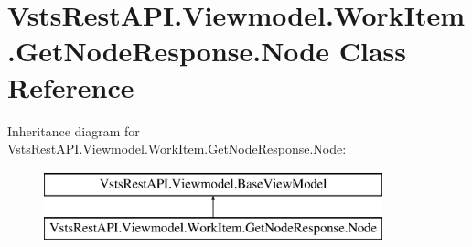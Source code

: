 \hypertarget{class_vsts_rest_a_p_i_1_1_viewmodel_1_1_work_item_1_1_get_node_response_1_1_node}{}\section{Vsts\+Rest\+A\+P\+I.\+Viewmodel.\+Work\+Item.\+Get\+Node\+Response.\+Node Class Reference}
\label{class_vsts_rest_a_p_i_1_1_viewmodel_1_1_work_item_1_1_get_node_response_1_1_node}
Inheritance diagram for Vsts\+Rest\+A\+P\+I.\+Viewmodel.\+Work\+Item.\+Get\+Node\+Response.\+Node\+:\begin{figure}[H]
\begin{center}
\leavevmode
\includegraphics[height=2.000000cm]{class_vsts_rest_a_p_i_1_1_viewmodel_1_1_work_item_1_1_get_node_response_1_1_node}
\end{center}
\end{figure}
